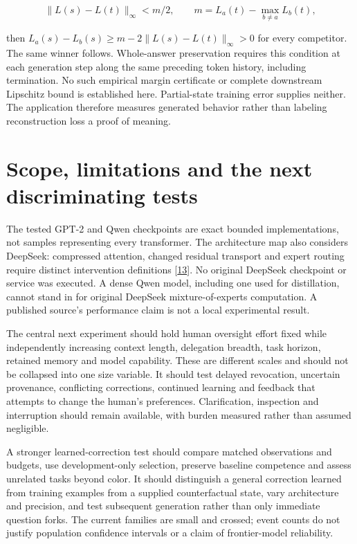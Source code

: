\documentclass[11pt,letterpaper]{article}
\begin{document}
\begin{equation}
\lVert L(s)-L(t)\rVert_\infty<m/2,\qquad
m=L_a(t)-\max_{b\ne a}L_b(t), \tag{12}
\end{equation}

then \(L_a(s)-L_b(s)\ge m-2\lVert L(s)-L(t)\rVert_\infty>0\) for every competitor. The same winner follows. Whole-answer preservation requires this condition at each generation step along the same preceding token history, including termination. No such empirical margin certificate or complete downstream Lipschitz bound is established here. Partial-state training error supplies neither. The application therefore measures generated behavior rather than labeling reconstruction loss a proof of meaning.

\section{Scope, limitations and the next discriminating tests}

The tested GPT-2 and Qwen checkpoints are exact bounded implementations, not samples representing every transformer. The architecture map also considers DeepSeek: compressed attention, changed residual transport and expert routing require distinct intervention definitions [\hyperref[ref:13]{13}]. No original DeepSeek checkpoint or service was executed. A dense Qwen model, including one used for distillation, cannot stand in for original DeepSeek mixture-of-experts computation. A published source's performance claim is not a local experimental result.

The central next experiment should hold human oversight effort fixed while independently increasing context length, delegation breadth, task horizon, retained memory and model capability. These are different scales and should not be collapsed into one size variable. It should test delayed revocation, uncertain provenance, conflicting corrections, continued learning and feedback that attempts to change the human's preferences. Clarification, inspection and interruption should remain available, with burden measured rather than assumed negligible.

A stronger learned-correction test should compare matched observations and budgets, use development-only selection, preserve baseline competence and assess unrelated tasks beyond color. It should distinguish a general correction learned from training examples from a supplied counterfactual state, vary architecture and precision, and test subsequent generation rather than only immediate question forks. The current families are small and crossed; event counts do not justify population confidence intervals or a claim of frontier-model reliability.
\end{document}
